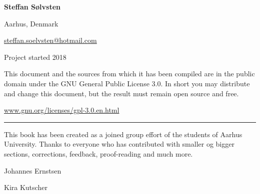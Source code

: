 \noindent \textbf{Steffan Sølvsten}

Aarhus, Denmark

\href{mailto:steffan.soelvsten@hotmail.com}{steffan.soelvsten@hotmail.com}

\vspace{1em}
\noindent Project started 2018

\vspace{1em}
\noindent This document and the sources from which it has been compiled are in
the public domain under the GNU General Public License 3.0. In short you may
distribute and change this document, but the result must remain open source and
free.

\begin{center}
  \href{https://www.gnu.org/licenses/gpl-3.0.en.html}{www.gnu.org/licenses/gpl-3.0.en.html}
\end{center}

\vspace{2em}
\noindent\hfil\rule{0.8\textwidth}{.4pt}\hfil

\vspace{2em}
\noindent This book has been created as a joined group effort of the students of Aarhus
University. Thanks to everyone who has contributed with smaller og bigger
sections, corrections, feedback, proof-reading and much more.
  
\begin{multicols}{2}
  Johannes Ernstsen

  \hfill
  \columnbreak
  
  Kira Kutscher
\end{multicols}